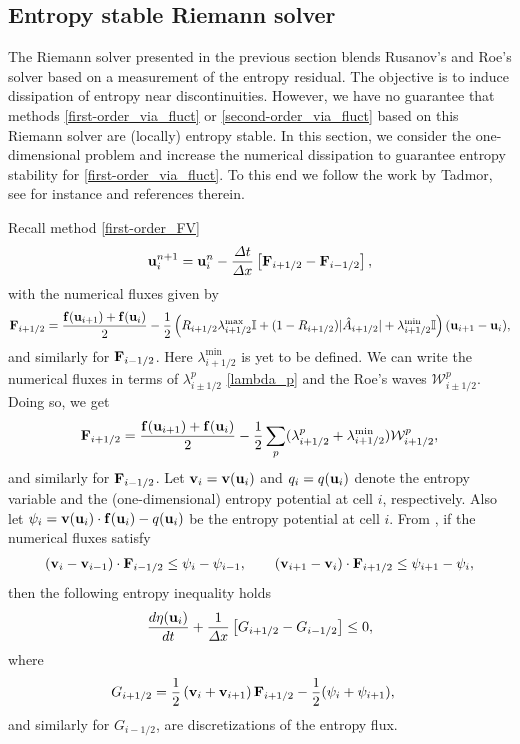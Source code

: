 \documentclass[preprint, 11pt]{article}
\newcommand{\W}{{\mathcal W}}
\newcommand{\bff}{{\bf f}}
\newcommand{\bfF}{{\bf F}}
\newcommand{\bfu}{{\bf u}}
\newcommand{\bfv}{{\bf v}}
\begin{document}
\subsection{Entropy stable Riemann solver}\label{sec:entropy_stable}
The Riemann solver presented in the previous section blends Rusanov's and Roe's solver based on a
measurement of the entropy residual. The objective is to induce dissipation of entropy 
near discontinuities. However, we have no guarantee that methods \eqref{first-order_via_fluct} 
or \eqref{second-order_via_fluct} based on this Riemann solver are (locally) entropy stable. 
In this section, we consider the one-dimensional problem and increase the numerical dissipation 
to guarantee entropy stability for \eqref{first-order_via_fluct}. 
To this end we follow the work by Tadmor, see for instance \cite{tadmor1987numerical, tadmor2003entropy} 
and references therein. 

Recall method \eqref{first-order_FV}
\begin{align*}
  \bfu_i^{n+1}=\bfu_i^n-\frac{\Delta t}{\Delta x}\left[\bfF_{i+1/2}-\bfF_{i-1/2}\right],
\end{align*}
with the numerical fluxes given by 
\begin{align*}
  \bfF_{i+1/2} = \frac{\bff(\bfu_{i+1})+\bff(\bfu_i)}{2} 
  - \frac{1}{2} \left( R_{i+1/2}\lambda_{i+1/2}^{\max}\mathbb{I} + (1-R_{i+1/2})|\hat A_{i+1/2}| +\lambda_{i+1/2}^{\min}\mathbb{I}\right)(\bfu_{i+1}-\bfu_{i}),
\end{align*}
and similarly for $\bfF_{i-1/2}$. Here $\lambda_{i+1/2}^{\min}$ is yet to be defined.
We can write the numerical fluxes in terms of $\lambda^p_{i\pm 1/2}$ \eqref{lambda_p}
and the Roe's waves $\W_{i\pm 1/2}^p$.
Doing so, we get
\begin{align*}
  \bfF_{i+1/2} = \frac{\bff(\bfu_{i+1})+\bff(\bfu_i)}{2} 
  - \frac{1}{2}\sum_p(\lambda_{i+1/2}^p+\lambda_{i+1/2}^{\min})\W_{i+1/2}^p,
\end{align*}
and similarly for $\bfF_{i-1/2}$.
Let $\bfv_i=\bfv(\bfu_i)$ and $q_i=q(\bfu_i)$ denote the entropy variable and the 
(one-dimensional) entropy potential at cell $i$, respectively. 
Also let $\psi_i=\bfv(\bfu_i)\cdot \bff(\bfu_i)-q(\bfu_i)$ be the entropy potential at cell $i$.
From \cite[\S 4]{tadmor1987numerical}, if the numerical fluxes satisfy
\begin{align}\label{es_cond}
(\bfv_{i}-\bfv_{i-1})\cdot \bfF_{i-1/2}\leq \psi_{i}-\psi_{i-1},
  \qquad
  (\bfv_{i+1}-\bfv_i)\cdot \bfF_{i+1/2}\leq \psi_{i+1}-\psi_i,
\end{align}
then the following entropy inequality holds 
\begin{align}\label{ent_ineq}
  \frac{d\eta(\bfu_i)}{dt}+\frac{1}{\Delta x}\left[G_{i+1/2}-G_{i-1/2}\right]\leq 0,
\end{align}
where 
\begin{align*}
    G_{i+1/2} &= \frac{1}{2}\left(\bfv_i+\bfv_{i+1}\right)\bfF_{i+1/2}-\frac{1}{2}(\psi_{i}+\psi_{i+1}),
\end{align*}
and similarly for $G_{i-1/2}$, are discretizations of the entropy flux. 
\end{document}
